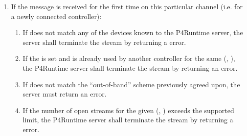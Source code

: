 \documentclass[11pt]{article}
\begin{document}
{\begin{enumerate}
\item{}
If the  message is received for the first time on
this particular channel (i.e. for a newly connected controller):%

\begin{enumerate}%

\item{}
If  does not match any of the devices known to the P4Runtime
server, the server shall terminate the stream by returning a
 error.%

\item{}
If the  is set and is already used by another controller for
the same (, ), the P4Runtime server shall terminate
the stream by returning an  error.%

\item{}
If  does not match the \textquotedblleft{}out-of-band\textquotedblright{} scheme previously
agreed upon, the server must return an  error.%

\item{}
If the number of open streams for the given (, )
exceeds the supported limit, the P4Runtime server shall terminate the
stream by returning a  error.%


\end{enumerate}
\end{enumerate}}
\end{document}
